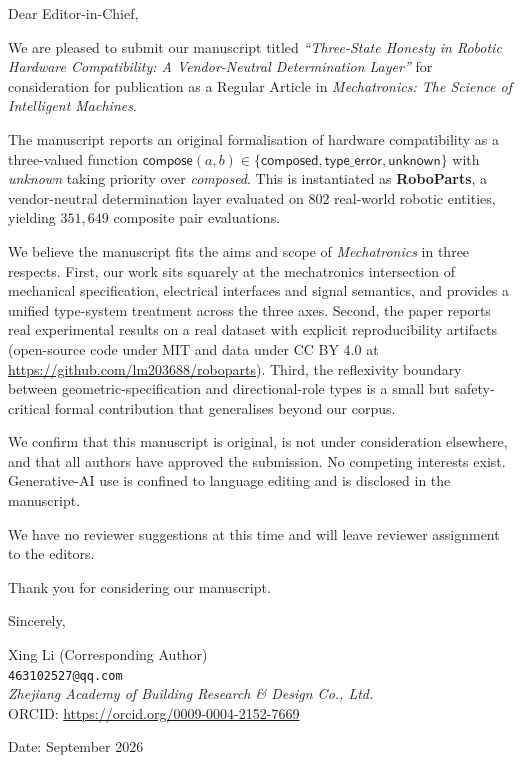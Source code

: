 \documentclass[12pt]{article}
\begin{document}
\vspace*{1cm}

Dear Editor-in-Chief,

We are pleased to submit our manuscript titled \emph{``Three-State
Honesty in Robotic Hardware Compatibility: A Vendor-Neutral
Determination Layer''} for consideration for publication as a Regular
Article in \emph{Mechatronics: The Science of Intelligent Machines}.

The manuscript reports an original formalisation of hardware
compatibility as a three-valued function
$\mathsf{compose}(a,b) \in \{\mathsf{composed}, \mathsf{type\_error},
\mathsf{unknown}\}$ with \emph{unknown} taking priority over
\emph{composed}. This is instantiated as \textbf{RoboParts}, a
vendor-neutral determination layer evaluated on $802$ real-world
robotic entities, yielding $351{,}649$ composite pair evaluations.

We believe the manuscript fits the aims and scope of \emph{Mechatronics}
in three respects. First, our work sits squarely at the mechatronics
intersection of mechanical specification, electrical interfaces and
signal semantics, and provides a unified type-system treatment across
the three axes. Second, the paper reports real experimental results
on a real dataset with explicit reproducibility artifacts
(open-source code under MIT and data under CC BY 4.0 at
\url{https://github.com/lm203688/roboparts}). Third, the reflexivity
boundary between geometric-specification and directional-role types is
a small but safety-critical formal contribution that generalises
beyond our corpus.

We confirm that this manuscript is original, is not under consideration
elsewhere, and that all authors have approved the submission. No
competing interests exist. Generative-AI use is confined to language
editing and is disclosed in the manuscript.

We have no reviewer suggestions at this time and will leave reviewer
assignment to the editors.

Thank you for considering our manuscript.

Sincerely,

\vspace{1.5cm}

Xing Li (Corresponding Author)\\
\texttt{463102527@qq.com}\\
\textit{Zhejiang Academy of Building Research \& Design Co., Ltd.}\\
ORCID: \url{https://orcid.org/0009-0004-2152-7669}

\vspace{2cm}

\noindent Date: September 2026
\end{document}
